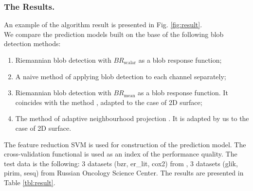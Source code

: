 \documentclass{llncs}
\newcommand{\FRScalar}{BR_{\mathrm{scalar}}}
\newcommand{\FRMean}{BR_{\mathrm{mean}}}
\begin{document}
	\subsubsection{The Results.}
An example of the algorithm result is presented in Fig. \ref{fig:result}.
\\
We compare the prediction models built on the base of the following blob detection methods: 
\begin{enumerate}
\item	Riemannian blob detection with $\FRScalar$ as a blob response function;
\item	A naive method of applying blob detection to each channel separately;
\item	Riemannian blob detection with $\FRMean$ as a blob response function. It coincides with the method \cite{ColorBlob}, adapted to the case of 2D surface;
\item	The method of adaptive neighbourhood projection \cite{GROM}. It is adapted by us to the case of 2D surface.
\end{enumerate}
The feature reduction SVM \cite{SVM} is used for construction of the prediction model. The cross-validation functional \cite{cross} is used as an index of the performance quality. The test data is the following: 3 datasets (bzr, er\_lit, cox2) from \cite{kernel}, 3 datasets (glik, pirim, sesq) from Russian Oncology Science Center. The results are presented in Table \ref{tbl:result}.
\end{document}
